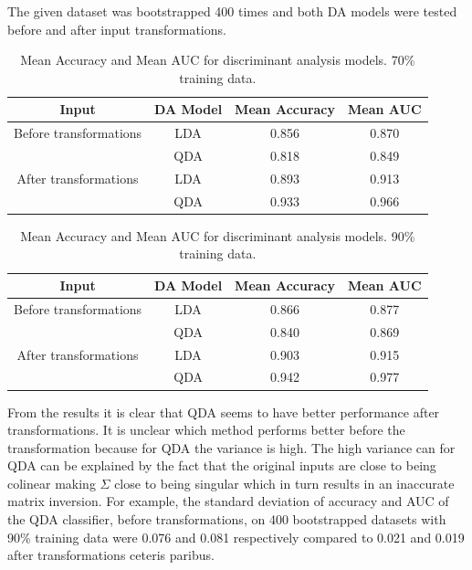 \documentclass[../../project.tex]{subfiles}
\begin{document}
	The given dataset was bootstrapped 400 times and both DA models were tested before and after input transformations.
	\begin{table}[h!]
		\centering
		\begin{tabular}{cccc}
			Input & DA Model & Mean Accuracy & Mean AUC \\
			\midrule
			Before transformations
			& LDA & 0.856 & 0.870 \\
		    & QDA & 0.818 & 0.849 \\
			\midrule
			After transformations
			& LDA & 0.893 & 0.913 \\
			& QDA & 0.933 & 0.966 \\
		\end{tabular}
		\caption{Mean Accuracy and Mean AUC for discriminant analysis models. 70\% training data.}
		\label{tab:discanal_table_70}
	\end{table}
	\begin{table}[h!]
		\centering
		\begin{tabular}{cccc}
			Input & DA Model & Mean Accuracy & Mean AUC \\
			\midrule
			Before transformations
			& LDA & 0.866 & 0.877 \\
		    & QDA & 0.840 & 0.869 \\
			\midrule
			After transformations
			& LDA & 0.903 & 0.915 \\
			& QDA & 0.942 & 0.977 \\
		\end{tabular}
		\caption{Mean Accuracy and Mean AUC for discriminant analysis models. 90\% training data.}
		\label{tab:discanal_table_90}
	\end{table}
	From the results it is clear that QDA seems to have better performance after transformations. It is unclear which method performs better before the transformation because for QDA the variance is high. The high variance can for QDA can be explained by the fact that the original inputs are close to being colinear making $\Sigma$ close to being singular which in turn results in an inaccurate matrix inversion. For example, the standard deviation of accuracy and AUC of the QDA classifier, before transformations, on 400 bootstrapped datasets with 90\% training data were 0.076 and 0.081 respectively compared to 0.021 and 0.019 after transformations ceteris paribus.
	
\end{document}
